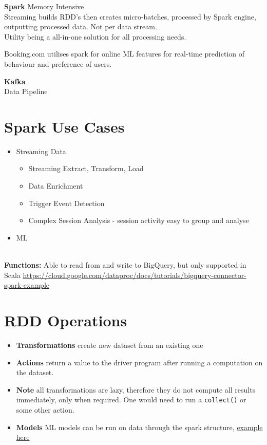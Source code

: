 \documentclass[english]{article}
\begin{document}
\textbf{Spark}
Memory Intensive \\
Streaming builds RDD's then creates micro-batches, processed by Spark engine, outputting processed data. Not per data stream. \\
Utility being a all-in-one solution for all processing needs.

Booking.com utilises spark for online ML features for real-time prediction of behaviour and preference of users.

\textbf{Kafka} \\
Data Pipeline \\


\section{Spark Use Cases}
\begin{itemize}
\item Streaming Data
	\begin{itemize}
		\item Streaming Extract, Transform, Load
		\item Data Enrichment
		\item Trigger Event Detection
		\item Complex Session Analysis - session activity easy to group and analyse
	\end{itemize}
\item ML
\end{itemize}
\\
\textbf{Functions:}
Able to read from and write to BigQuery, but only supported in Scala \href{example here}{https://cloud.google.com/dataproc/docs/tutorials/bigquery-connector-spark-example}

\section{RDD Operations}
\begin{itemize}
\item \textbf{Transformations } create new dataset from an existing one
\item \textbf{Actions } return a value to the driver program after running a computation on the dataset.
\item \textbf{Note } all transformations are lazy, therefore they do not compute all results immediately, only when required. One would need to run a \verb"collect()" or some other action.
\item \textbf{Models } ML models can be run on data through the spark structure, \href{https://github.com/apache/spark/blob/master/examples/src/main/python/kmeans.py}{example here}
\end{itemize}
\end{document}
